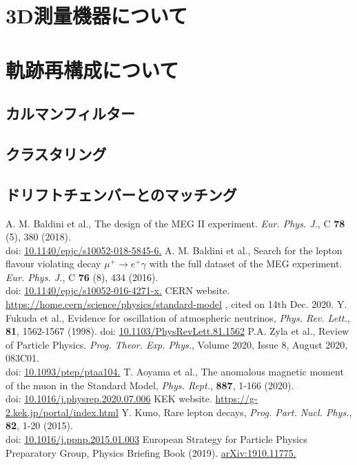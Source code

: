 \documentclass[report]{jsbook}
\begin{document}
\chapter{3D測量機器について}
\chapter{軌跡再構成について}
\section{カルマンフィルター}
\section{クラスタリング}
\section{ドリフトチェンバーとのマッチング}

\begin{thebibliography}{99}
 A. M. Baldini et al., The design of the MEG II experiment. {\it Eur. Phys. J.}, C {\bf 78} (5), 380 (2018). \\ 
doi: \href{https://doi.org/10.1140/epjc/s10052-018-5845-6}{10.1140/epjc/s10052-018-5845-6.}
 A. M. Baldini et al., Search for the lepton flavour violating decay $\mu^+ \to e^+ \gamma$ with the full dataset of the MEG experiment. {\it Eur. Phys. J.}, C {\bf 76} (8), 434 (2016). \\ 
doi: \href{https://doi.org/10.1140/epjc/s10052-016-4271-x}{10.1140/epjc/s10052-016-4271-x.}
 CERN website. \url{https://home.cern/science/physics/standard-model} , cited on 14th Dec. 2020.
 Y. Fukuda et al., Evidence for oscillation of atmospheric neutrinos, {\it Phys. Rev. Lett.}, {\bf 81}, 1562-1567 (1998). 
doi: \href{https://doi.org/10.1103/PhysRevLett.81.1562}{10.1103/PhysRevLett.81.1562}
 P.A. Zyla et al., Review of Particle Physics.  {\it Prog. Theor. Exp. Phys.}, Volume 2020, Issue 8, August 2020, 083C01. \\
doi: \href{https://doi.org/10.1093/ptep/ptaa104}{10.1093/ptep/ptaa104.}
 T. Aoyama et al., The anomalous magnetic moment of the muon in the Standard Model, {\it Phys. Rept.}, {\bf 887}, 1-166 (2020). \\
doi: \href{https://doi.org/10.1016/j.physrep.2020.07.006}{10.1016/j.physrep.2020.07.006}
 KEK website. \url{https://g-2.kek.jp/portal/index.html}
 Y. Kuno, Rare lepton decays, {\it Prog. Part. Nucl. Phys.}, {\bf 82}, 1-20 (2015). \\
doi: \href{https://doi.org/10.1016/j.ppnp.2015.01.003}{10.1016/j.ppnp.2015.01.003}
 European Strategy for Particle Physics Preparatory Group, Physics Briefing Book (2019). \href{http://arxiv.org/abs/1910.11775}{arXiv:1910.11775.} 
\end{thebibliography}
\end{document}
